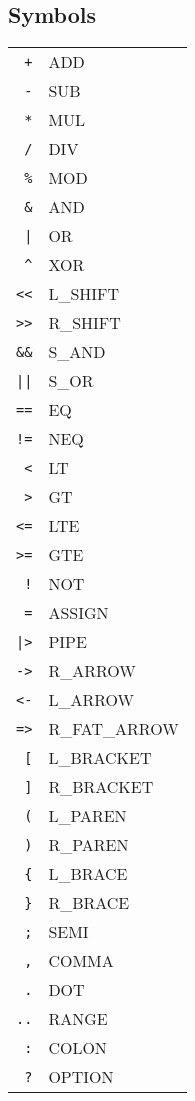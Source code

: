 \documentclass{article}
\begin{document}
		\subsection{Symbols}
			\begin{tabular}{rl}
				\texttt{+} & ADD\\
				\texttt{-} & SUB\\
				\texttt{*} & MUL\\
				\texttt{/} & DIV\\
				\texttt{\%} & MOD\\
				\texttt{\&} & AND\\
				\texttt{|} & OR\\
				\texttt{\^} & XOR\\
				\texttt{<<} & L\_SHIFT\\
				\texttt{>>} & R\_SHIFT\\
				\texttt{\&\&} & S\_AND\\
				\texttt{||} & S\_OR\\
				\texttt{==} & EQ\\
				\texttt{!=} & NEQ\\
				\texttt{<} & LT\\
				\texttt{>} & GT\\
				\texttt{<=} & LTE\\
				\texttt{>=} & GTE\\
				\texttt{!} & NOT\\
				\texttt{=} & ASSIGN\\
				\texttt{|>} & PIPE\\
				\texttt{->} & R\_ARROW\\
				\texttt{<-} & L\_ARROW\\
				\texttt{=>} & R\_FAT\_ARROW\\
				\texttt{[} & L\_BRACKET\\
				\texttt{]} & R\_BRACKET\\
				\texttt{(} & L\_PAREN\\
				\texttt{)} & R\_PAREN\\
				\texttt{\{} & L\_BRACE\\
				\texttt{\}} & R\_BRACE\\
				\texttt{;} & SEMI\\
				\texttt{,} & COMMA\\
				\texttt{.} & DOT\\
				\texttt{..} & RANGE\\
				\texttt{:} & COLON\\
				\texttt{?} & OPTION\\
			\end{tabular}
\end{document}
